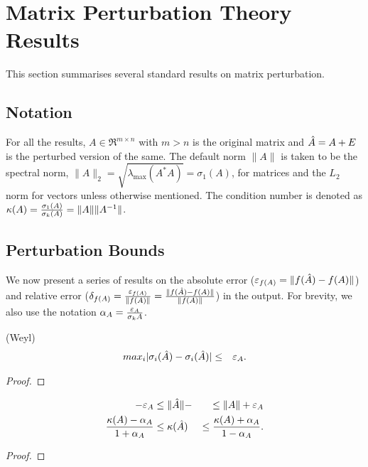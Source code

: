 \section{Matrix Perturbation Theory Results}\label{sec:perturbation-theory}

This section summarises several standard results on matrix perturbation.

\subsection{Notation}

For all the results, $A \in \Re^{m \times n}$ with $m > n$ is the
original matrix and $\hat{A} = A + E$ is the perturbed version of the same.
The default norm $\|A\|$ is taken to be the spectral norm, $\|A\|_2
= \sqrt{ \lambda_{\max}(A^*A) } = \sigma_1(A)$, for matrices and the
$L_2$ norm for vectors unless otherwise mentioned. The condition number
is denoted as $\kappa(A) = \frac{\sigma_1(A)}{\sigma_k(A)} = \|A\|
\|A^{-1}\|$.

\subsection{Perturbation Bounds}

We now present a series of results on the absolute error ($\varepsilon_{f(A)}
= \|f(\hat{A}) - f(A)\|$) and relative error ($\delta_{f(A)}
= \frac{\varepsilon_{f(A)}}{\|f(A)\|} = \frac{\|f(\hat{A}) - f(A)\|}{\|f(A)\|}$) in
the output. For brevity, we also use the notation $\alpha_{A}
= \frac{\varepsilon_{A}}{\sigma_k{A}}$.

\begin{theorem}(Weyl)
  \label{thm:weyl}
  \begin{eqnarray}
    max_i | \sigma_{i}(\hat{A}) - \sigma_{i}(\hat{A}) | &\le& \varepsilon_{A}.
  \end{eqnarray}
\end{theorem}
\begin{proof}
\end{proof}

\begin{corollary}
  \label{corr:weyl}
  \begin{align}
     - \varepsilon_{A} &\le \| \hat{A} \| -  &\le \|A\| + \varepsilon_{A} \\
    \frac{\kappa(A) - \alpha_{A}}{1 + \alpha_{A}} &\le \kappa(\hat{A}) &\le \frac{\kappa(A) + \alpha_{A}}{1 - \alpha_{A}}.
  \end{align}
\end{corollary}
\begin{proof}
\end{proof}

